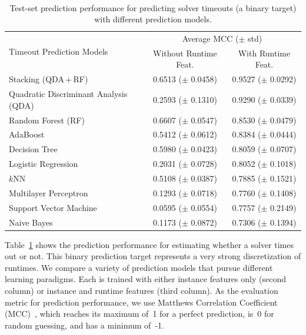 \documentclass[sn-basic, Numbered]{sn-jnl} %
\begin{document}
\begin{table}[tb]
	\centering
	\caption{Test-set prediction performance for predicting solver timeouts (a binary target) with different prediction models.}
	\label{tab:timeout-prediction}
	~\\[1em]
	\begin{tabular}{lcc}
		\toprule
		\multirow[c]{2}{*}{Timeout Prediction Models} & \multicolumn{2}{c}{Average MCC ($\pm$ std)} \\
		\cmidrule(lr){2-3}
		& {Without Runtime Feat.} & {With Runtime Feat.} \\
		\midrule
		Stacking (QDA\,+\,RF)                 & 0.6513 ($\pm$ 0.0458) & 0.9527 ($\pm$ 0.0292) \\[0.4ex]
		Quadratic Discriminant Analysis (QDA)                    & 0.2593 ($\pm$ 0.1310) & 0.9290 ($\pm$ 0.0339) \\[0.4ex]
		Random Forest (RF)         & 0.6607 ($\pm$ 0.0547) & 0.8530 ($\pm$ 0.0479) \\[0.4ex]
		AdaBoost                             & 0.5412 ($\pm$ 0.0612) & 0.8384 ($\pm$ 0.0444) \\[0.4ex]
		Decision Tree                         & 0.5980 ($\pm$ 0.0423) & 0.8059 ($\pm$ 0.0707) \\[0.4ex]
		Logistic Regression                   & 0.2031 ($\pm$ 0.0728) & 0.8052 ($\pm$ 0.1018) \\[0.4ex]
		$k$NN                   & 0.5108 ($\pm$ 0.0387) & 0.7885 ($\pm$ 0.1521) \\[0.4ex]
		Multilayer Perceptron                      & 0.1293 ($\pm$ 0.0718) & 0.7760 ($\pm$ 0.1408) \\[0.4ex]
		Support Vector Machine               & 0.0595 ($\pm$ 0.0554) & 0.7757 ($\pm$ 0.2149) \\[0.4ex]
		Naive Bayes                           & 0.1173 ($\pm$ 0.0872) & 0.7306 ($\pm$ 0.1394) \\
		\bottomrule
	\end{tabular}
\end{table}

Table~\ref{tab:timeout-prediction} shows the prediction performance for estimating whether a solver times out or not.
This binary prediction target represents a very strong discretization of runtimes.
We compare a variety of prediction models that pursue different learning paradigms.
Each is trained with either instance features only (second column) or instance and runtime features (third column).
As the evaluation metric for prediction performance, we use Matthews Correlation Coefficient (MCC)~\cite{gorodkin2004comparing, matthews1975comparison}, which reaches its maximum of~1 for a perfect prediction, is~0 for random guessing, and has a minimum of~-1.
\end{document}
